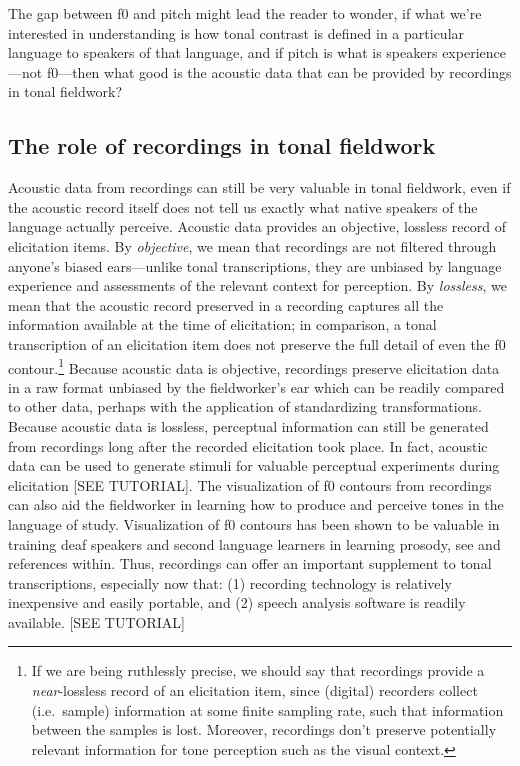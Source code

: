 \documentclass[12pt]{article}
\begin{document}
The gap between f0 and pitch might lead the reader to wonder, if what       
we're interested in understanding is how tonal contrast is defined in
a particular language to speakers of that language, and if pitch is
what is speakers experience---not f0---then what good is the acoustic
data that can be provided by recordings in tonal fieldwork? 

\subsection{The role of recordings in tonal fieldwork}
\label{sec:f0-record}

Acoustic data from recordings can still be very valuable in tonal
fieldwork, even if the acoustic record itself does not tell us exactly
what native speakers of the language actually perceive. Acoustic data
provides an objective, lossless record of elicitation items. By
\textit{objective}, we mean that recordings are not filtered through
anyone's biased ears---unlike tonal transcriptions, they are unbiased by language
experience and assessments of the relevant context for perception. By
\textit{lossless}, we mean that the acoustic record preserved in a
recording captures all the information available at the time of
elicitation; in comparison, a tonal transcription of an elicitation
item does not preserve the full detail of even the f0
contour.\footnote{If we are being ruthlessly precise, we should say
  that recordings provide a \textit{near}-lossless record of an
  elicitation item, since (digital) recorders collect (i.e.\ sample) information at
  some finite sampling rate, such that information between the samples
  is lost. Moreover, recordings don't preserve potentially relevant
  information for tone perception such as the visual context.}
Because acoustic data is objective, recordings preserve elicitation
data in a raw format unbiased by the fieldworker's ear which can be
readily compared to other data, perhaps with the application of
standardizing transformations. Because acoustic data is lossless,
perceptual information can still be generated from recordings long
after the recorded elicitation took place. In fact, acoustic data can
be used to generate stimuli for valuable perceptual experiments during
elicitation [SEE TUTORIAL]. The visualization of f0
contours from recordings can also aid the fieldworker in learning how
to produce and perceive tones in the language of study. Visualization
of f0 contours has been shown to be valuable in training deaf speakers
and second language learners in learning prosody, see
\citet{Hermes:1998,Hardison:2004} and references within.  Thus,
recordings can offer an important supplement to tonal transcriptions,
especially now that: (1) recording technology is relatively inexpensive and
easily portable, and (2) speech analysis software is readily available.
[SEE TUTORIAL]
\end{document}
